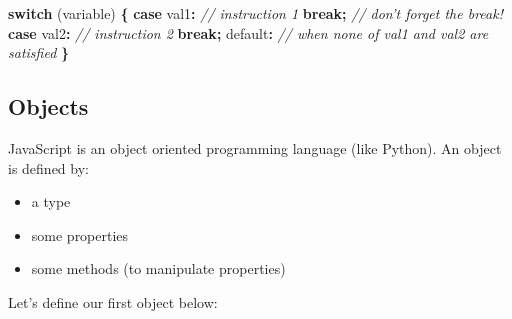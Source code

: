 \documentclass[]{book}
\newenvironment{Shaded}{\begin{snugshade}}{\end{snugshade}}
\newcommand{\CommentTok}[1]{\textcolor[rgb]{0.56,0.35,0.01}{\textit{#1}}}
\newcommand{\ControlFlowTok}[1]{\textcolor[rgb]{0.13,0.29,0.53}{\textbf{#1}}}
\newcommand{\DataTypeTok}[1]{\textcolor[rgb]{0.13,0.29,0.53}{#1}}
\newcommand{\NormalTok}[1]{#1}
\newcommand{\OperatorTok}[1]{\textcolor[rgb]{0.81,0.36,0.00}{\textbf{#1}}}
\providecommand{\tightlist}{%
  \setlength{\itemsep}{0pt}\setlength{\parskip}{0pt}}
\begin{document}
\begin{Shaded}
\begin{Highlighting}[]
\ControlFlowTok{switch}\NormalTok{ (variable) }\OperatorTok{\{}
  \ControlFlowTok{case} \DataTypeTok{val1}\OperatorTok{:} \CommentTok{// instruction 1}
  \ControlFlowTok{break}\OperatorTok{;} \CommentTok{// don't forget the break!}
  \ControlFlowTok{case} \DataTypeTok{val2}\OperatorTok{:}  \CommentTok{// instruction 2}
  \ControlFlowTok{break}\OperatorTok{;}
  \DataTypeTok{default}\OperatorTok{:} \CommentTok{// when none of val1 and val2 are satisfied}
\OperatorTok{\}}
\end{Highlighting}
\end{Shaded}

\hypertarget{objects}{%
\subsection{Objects}\label{objects}}

JavaScript is an object oriented programming language (like Python). An object is defined by:

\begin{itemize}
\tightlist
\item
  a type
\item
  some properties
\item
  some methods (to manipulate properties)
\end{itemize}

Let's define our first object below:
\end{document}
